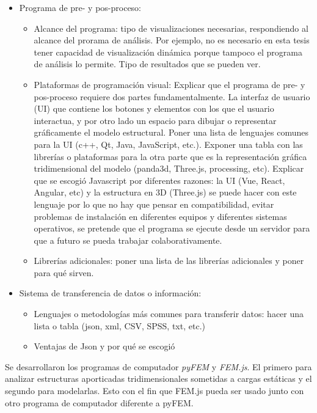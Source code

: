 {\begin{itemize}
  \item Programa de pre- y pos-proceso:
    \begin{itemize}
      \item Alcance del programa: tipo de visualizaciones necesarias, respondiendo al alcance del prorama de análisis. Por ejemplo, no es necesario en esta tesis tener capacidad de visualización dinámica porque tampoco el programa de análisis lo permite. Tipo de resultados que se pueden ver.
      \item Plataformas de programación visual: Explicar que el programa de pre- y pos-proceso requiere dos partes fundamentalmente. La interfaz de usuario (UI) que contiene los botones y elementos con los que el usuario interactua, y por otro lado un espacio para dibujar o representar gráficamente el modelo estructural. Poner una lista de lenguajes comunes para la UI (c++, Qt, Java, JavaScript, etc.). Exponer una tabla con las librerías o plataformas para la otra parte que es la representación gráfica tridimensional del modelo (panda3d, Three.js, processing, etc). Explicar que se escogió Javascript por diferentes razones: la UI (Vue, React, Angular, etc) y la estructura en 3D (Three.js) se puede hacer con este lenguaje por lo que no hay que pensar en compatibilidad, evitar problemas de instalación en diferentes equipos y diferentes sistemas operativos, se pretende que el programa se ejecute desde un servidor para que a futuro se pueda trabajar colaborativamente.
      \item Librerías adicionales: poner una lista de las librerías adicionales y poner para qué sirven.
    \end{itemize}

  \item Sistema de transferencia de datos o información:
    \begin{itemize}
      \item Lenguajes o metodologías más comunes para transferir datos: hacer una lista o tabla (json, xml, CSV, SPSS, txt, etc.) 
      \item Ventajas de Json y por qué se escogió
    \end{itemize}

\end{itemize}
}

Se desarrollaron los programas de computador \emph{pyFEM} y \emph{FEM.js}. El primero para analizar estructuras aporticadas tridimensionales sometidas a cargas estáticas y el segundo para modelarlas. Esto con el fin que FEM.js pueda ser usado junto con otro programa de computador diferente a pyFEM.\\

